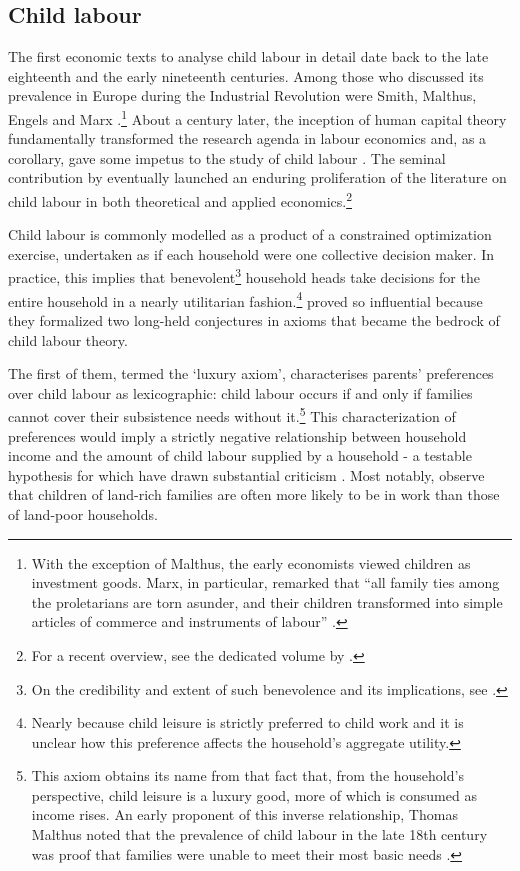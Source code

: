 \documentclass[a4paper,12pt]{article}
\theoremstyle{plain}
\theoremstyle{definition}
\theoremstyle{definition}
\theoremstyle{definition}
\theoremstyle{definition}
\begin{document}
\subsection{Child labour}
\label{sub:child_labour}
The first economic texts to analyse child labour in detail date back to the late eighteenth and the early nineteenth centuries. Among those who discussed its prevalence in Europe during the Industrial Revolution were Smith, Malthus, Engels and Marx \citep{Edmonds2007}.\footnote{With the exception of Malthus, the early economists viewed children as investment goods. Marx, in particular, remarked that ``all family ties among the proletarians are torn asunder, and their children transformed into simple articles of commerce and instruments of labour'' \citep{Marx1848}.} About a century later, the inception of human capital theory \citep{Mincer1958, Schultz1961, Becker1964} fundamentally transformed the research agenda in labour economics and, as a corollary, gave some impetus to the study of child labour \citep[see e.g.][]{Rosenzweig1977}. The seminal contribution by \citet{Basu1998} eventually launched an enduring proliferation of the literature on child labour \citep{Edmonds2007} in both theoretical and applied economics.\footnote{For a recent overview, see the dedicated volume by \citet{Posso2020}.}

Child labour is commonly modelled as a product of a constrained optimization exercise, undertaken as if each household were one collective decision maker. In practice, this implies that benevolent\footnote{On the credibility and extent of such benevolence and its implications, see \citet{Bhalotra2002}.} household heads take decisions for the entire household in a nearly utilitarian fashion.\footnote{Nearly because child leisure is strictly preferred to child work and it is unclear how this preference affects the household's aggregate utility.} \citet{Basu1998} proved so influential because they formalized two long-held conjectures in axioms that became the bedrock of child labour theory.

The first of them, termed the `luxury axiom', characterises parents' preferences over child labour as lexicographic: child labour occurs if and only if families cannot cover their subsistence needs without it.\footnote{This axiom obtains its name from that fact that, from the household's perspective, child leisure is a luxury good, more of which is consumed as income rises. An early proponent of this inverse relationship, Thomas Malthus noted that the prevalence of child labour in the late 18th century was proof that families were unable to meet their most basic needs \citep[see][]{Edmonds2007}.} This characterization of preferences would imply a strictly negative relationship between household income and the amount of child labour supplied by a household - a testable hypothesis for which \citet{Basu1998} have drawn substantial criticism \citep[see e.g.][]{Edmonds2012}. Most notably, \citet{Bhalotra2000,Bhalotra2003} observe that children of land-rich families are often more likely to be in work than those of land-poor households.
\end{document}
